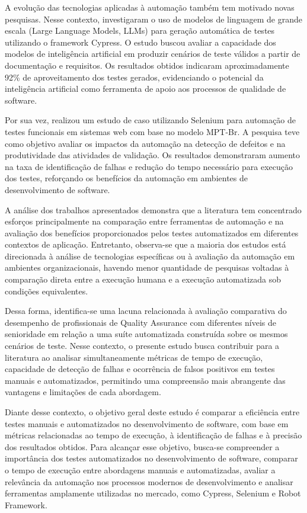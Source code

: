 \documentclass{UNESC}
\begin{document}
A evolução das tecnologias aplicadas à automação também tem motivado novas pesquisas. Nesse contexto,  investigaram o uso de modelos de linguagem de grande escala (Large Language Models, LLMs) para geração automática de testes utilizando o framework Cypress. O estudo buscou avaliar a capacidade dos modelos de inteligência artificial em produzir cenários de teste válidos a partir de documentação e requisitos. Os resultados obtidos indicaram aproximadamente 92\% de aproveitamento dos testes gerados, evidenciando o potencial da inteligência artificial como ferramenta de apoio aos processos de qualidade de software.

Por sua vez,  realizou um estudo de caso utilizando Selenium para automação de testes funcionais em sistemas web com base no modelo MPT-Br. A pesquisa teve como objetivo avaliar os impactos da automação na detecção de defeitos e na produtividade das atividades de validação. Os resultados demonstraram aumento na taxa de identificação de falhas e redução do tempo necessário para execução dos testes, reforçando os benefícios da automação em ambientes de desenvolvimento de software.

A análise dos trabalhos apresentados demonstra que a literatura tem concentrado esforços principalmente na comparação entre ferramentas de automação e na avaliação dos benefícios proporcionados pelos testes automatizados em diferentes contextos de aplicação. Entretanto, observa-se que a maioria dos estudos está direcionada à análise de tecnologias específicas ou à avaliação da automação em ambientes organizacionais, havendo menor quantidade de pesquisas voltadas à comparação direta entre a execução humana e a execução automatizada sob condições equivalentes.

Dessa forma, identifica-se uma lacuna relacionada à avaliação comparativa do desempenho de profissionais de Quality Assurance com diferentes níveis de senioridade em relação a uma suíte automatizada construída sobre os mesmos cenários de teste. Nesse contexto, o presente estudo busca contribuir para a literatura ao analisar simultaneamente métricas de tempo de execução, capacidade de detecção de falhas e ocorrência de falsos positivos em testes manuais e automatizados, permitindo uma compreensão mais abrangente das vantagens e limitações de cada abordagem.

Diante desse contexto, o objetivo geral deste estudo é comparar a eficiência entre testes manuais e automatizados no desenvolvimento de software, com base em métricas relacionadas ao tempo de execução, à identificação de falhas e à precisão dos resultados obtidos. Para alcançar esse objetivo, busca-se compreender a importância dos testes automatizados no desenvolvimento de software, comparar o tempo de execução entre abordagens manuais e automatizadas, avaliar a relevância da automação nos processos modernos de desenvolvimento e analisar ferramentas amplamente utilizadas no mercado, como Cypress, Selenium e Robot Framework.
\end{document}
